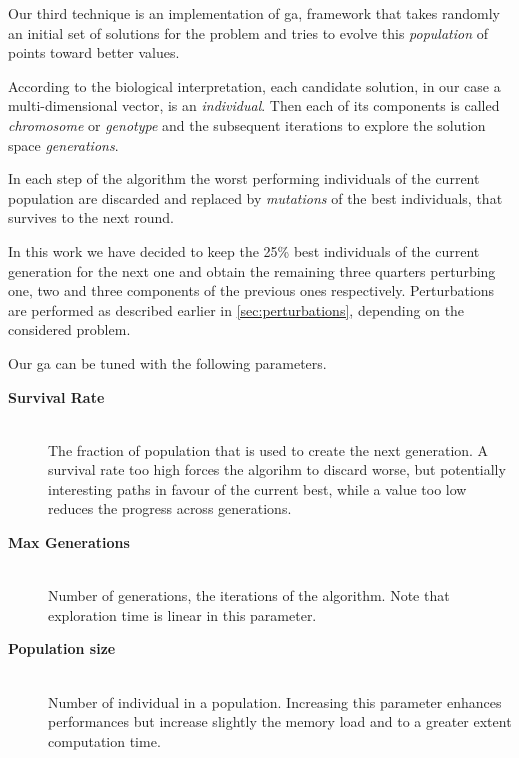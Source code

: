\documentclass[12pt,journal,draftclsnofoot,onecolumn]{IEEEtran}
\begin{document}
Our third technique is an implementation of \gls{ga}, framework that takes randomly an initial set of solutions for the problem and tries to evolve this \emph{population} of points toward better values.

According to the biological interpretation, each candidate solution, in our case a multi-dimensional vector, is an \emph{individual}.
Then each of its components is called \emph{chromosome} or \emph{genotype} and the subsequent iterations to explore the solution space \emph{generations}.

In each step of the algorithm the worst performing individuals of the current population are discarded and replaced by \emph{mutations} of the best individuals, that survives to the next round.

In this work we have decided to keep the 25\% best individuals of the current generation for the next one and obtain the remaining three quarters perturbing one, two and three components of the previous ones respectively. Perturbations are performed as described earlier in \autoref{sec:perturbations}, depending on the considered problem.

Our \gls{ga} can be tuned with the following parameters.
\begin{description}
	\item[\textbf{Survival Rate}] \hfill \\
	The fraction of population that is used to create the next generation. A survival rate too high forces the algorihm to discard worse, but potentially interesting paths in favour of the current best, while a value too low reduces the progress across generations.
	\item[\textbf{Max Generations}] \hfill \\
	Number of generations, the iterations of the algorithm. Note that exploration time is linear in this parameter.
	\item[\textbf{Population size}] \hfill \\
	Number of individual in a population. Increasing this parameter enhances performances but increase slightly the memory load and to a greater extent computation time.
\end{description}
\end{document}
